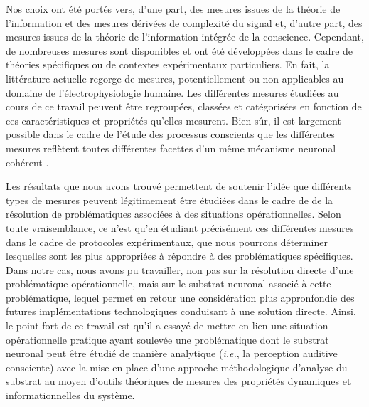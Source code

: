Nos choix ont été portés vers, d'une part, des mesures issues de la théorie de l'information et des mesures dérivées de complexité du signal et, d'autre part, des mesures issues de la théorie de l'information intégrée de la conscience. 
Cependant, de nombreuses mesures sont disponibles et ont été développées dans le cadre de théories spécifiques ou de contextes expérimentaux particuliers.  
En fait, la littérature actuelle regorge de mesures, potentiellement ou non applicables au domaine de l'électrophysiologie humaine. 
Les différentes mesures étudiées au cours de ce travail peuvent être regroupées, classées et catégorisées en fonction de ces caractéristiques et propriétés qu'elles mesurent. 
Bien sûr, il est largement possible dans le cadre de l'étude des processus conscients que les différentes mesures reflètent toutes différentes facettes d'un même mécanisme neuronal cohérent \citep{king2014characterizing}. 

Les résultats que nous avons trouvé permettent de soutenir l'idée que différents types de mesures peuvent légitimement être étudiées dans le cadre de de la résolution de problématiques associées à des situations opérationnelles. 
Selon toute vraisemblance, ce n'est qu'en étudiant précisément ces différentes mesures dans le cadre de protocoles expérimentaux, que nous pourrons déterminer lesquelles sont les plus appropriées à répondre à des problématiques spécifiques. 
Dans notre cas, nous avons pu travailler, non pas sur la résolution directe d'une problématique opérationnelle, mais sur le substrat neuronal associé à cette problématique, lequel permet en retour une considération plus appronfondie des futures implémentations technologiques conduisant à une solution directe. 
Ainsi, le point fort de ce travail est qu'il a essayé de mettre en lien une situation opérationnelle pratique ayant soulevée une problématique dont le substrat neuronal peut être étudié de manière analytique (\textit{i.e.}, la perception auditive consciente) avec la mise en place d'une approche méthodologique d'analyse du substrat au moyen d'outils théoriques de mesures des propriétés dynamiques et informationnelles du système.

